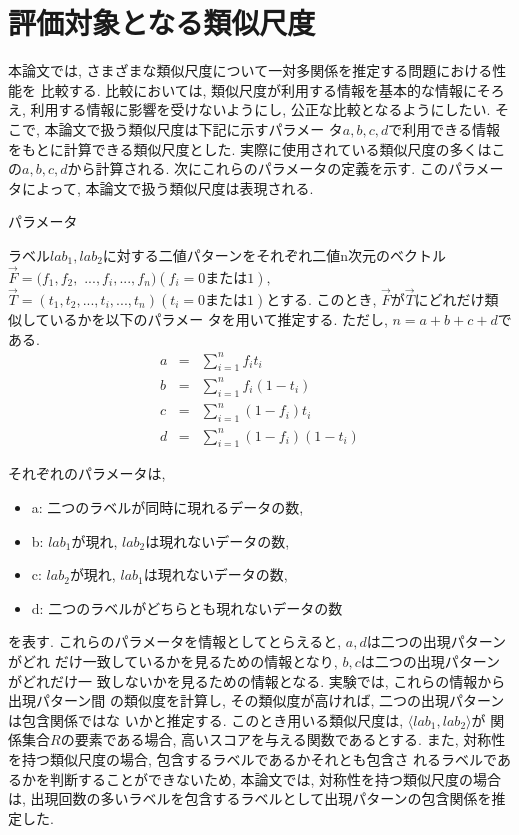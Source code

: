 \section{評価対象となる類似尺度}
本論文では, さまざまな類似尺度について一対多関係を推定する問題における性能を
比較する. 
比較においては, 類似尺度が利用する情報を基本的な情報にそろえ, 
利用する情報に影響を受けないようにし, 
公正な比較となるようにしたい. 
そこで, 本論文で扱う類似尺度は下記に示すパラメー
タ$a,b,c,d$で利用できる情報をもとに計算できる類似尺度とした. 
実際に使用されている類似尺度の多くはこの$a,b,c,d$から計算される. 
次にこれらのパラメータの定義を示す. 
このパラメータによって, 本論文で扱う類似尺度は表現される. 
\newpage
\begin{df} パラメータ\label{para}

ラベル$lab_1,lab_2$に対する二値パターンをそれぞれ二値n次元のベクトル
$\vec{F}=(f_1,f_2,$ $...,f_i,...,f_n)(f_i=0または1), $
$\vec{T}=(t_1,t_2,...,t_i,...,t_n)(t_i=0または1)$とする. 
このとき, $\vec{F}$が$\vec{T}$にどれだけ類似しているかを以下のパラメー
タを用いて推定する. 
ただし, $n=a+b+c+d$である. 
\begin{eqnarray}
a &=& \sum_{i=1}^nf_i t_i\label{csm_a} \\
b &=& \sum_{i=1}^nf_i (1-t_i)\label{csm_b} \\
c &=& \sum_{i=1}^n(1-f_i) t_i\label{csm_c} \\
d &=&\sum_{i=1}^n(1-f_i) (1-t_i)\label{csm_d}
\end{eqnarray}
\end{df}
それぞれのパラメータは, 
\begin{itemize}
\item a: 二つのラベルが同時に現れるデータの数, 
\item b: $lab_1$が現れ, $lab_2$は現れないデータの数,  
\item c: $lab_2$が現れ, $lab_1$は現れないデータの数, 
\item d: 二つのラベルがどちらとも現れないデータの数
\end{itemize}
を表す. 
これらのパラメータを情報としてとらえると, $a,d$は二つの出現パターンがどれ
だけ一致しているかを見るための情報となり, $b,c$は二つの出現パターンがどれだけ一
致しないかを見るための情報となる. 実験では, これらの情報から出現パターン間
の類似度を計算し, その類似度が高ければ, 二つの出現パターンは包含関係ではな
いかと推定する. 
このとき用いる類似尺度は, $\langle lab_1,lab_2\rangle$が
関係集合$R$の要素である場合, 高いスコアを与える関数であるとする. 
また, 対称性を持つ類似尺度の場合, 包含するラベルであるかそれとも包含さ
れるラベルであるかを判断することができないため, 
本論文では, 対称性を持つ類似尺度の場合は, 
出現回数の多いラベルを包含するラベルとして出現パターンの包含関係を推定した. 

